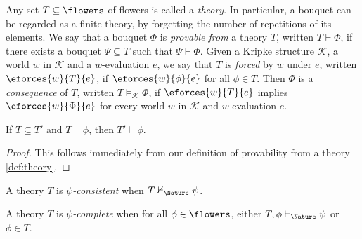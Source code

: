 \begin{definition}[Theory]\label{def:theory} 
  
  Any set $T \subseteq \flowers$ of flowers is called a \emph{theory}. In
  particular, a bouquet can be regarded as a finite theory, by forgetting the
  number of repetitions of its elements. We say that a bouquet $\Phi$ is
  \emph{provable from} a theory $T$, written $T \vdash \Phi$, if there exists a
  bouquet $\Psi \subseteq T$ such that $\Psi \vdash \Phi$. Given a Kripke
  structure $\mathcal{K}$, a world $w$ in $\mathcal{K}$ and a $w$-evaluation
  $e$, we say that $T$ is \emph{forced} by $w$ under $e$, written
  $\eforces{w}{T}{e}$, if $\eforces{w}{\phi}{e}$ for all $\phi \in T$. Then
  $\Phi$ is a \emph{consequence} of $T$, written $T \vDash_{\mathcal{K}} \Phi$,
  if $\eforces{w}{T}{e}$ implies $\eforces{w}{\Phi}{e}$ for every world $w$ in
  $\mathcal{K}$ and $w$-evaluation $e$.
\end{definition}

\begin{lemma}[Weakening]\label{thm:weakening}
  If $T \subseteq T'$ and $T \vdash \phi$, then $T' \vdash \phi$.
\end{lemma}
\begin{proof}
  This follows immediately from our definition of provability from a theory
  \ref{def:theory}.
\end{proof}

\begin{definition}
  A theory $T$ is \emph{$\psi$-consistent} when $T \nvdash_\Nature \psi$.
\end{definition}

\begin{definition}
  A theory $T$ is \emph{$\psi$-complete} when for all $\phi \in \flowers$,
  either $T, \phi \vdash_\Nature \psi$ or $\phi \in T$.
\end{definition}


